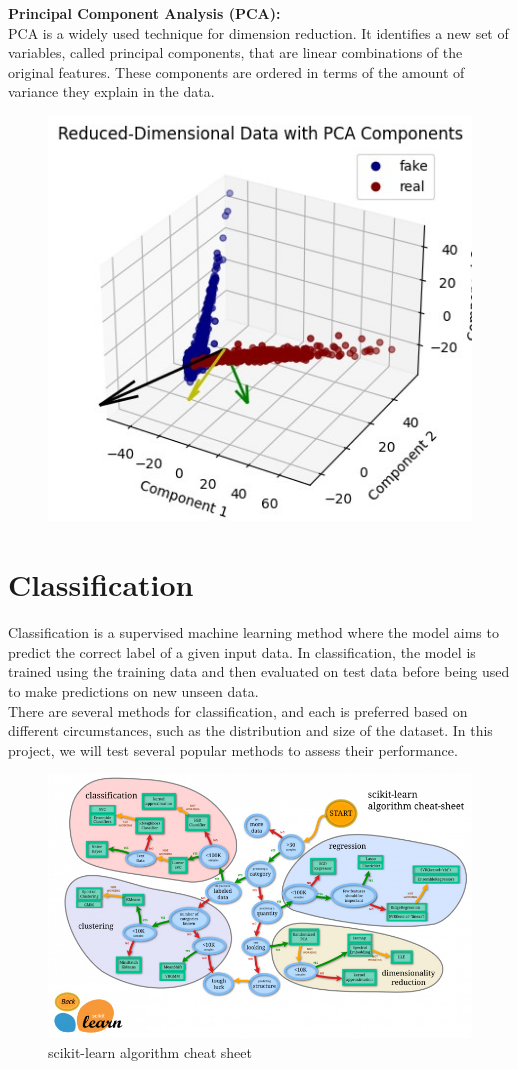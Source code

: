 \documentclass{template}
\begin{document}
\textbf{Principal Component Analysis (PCA):}\\
PCA is a widely used technique for dimension reduction. It identifies a new set of variables, called principal components, that are linear combinations of the original features. These components are ordered in terms of the amount of variance they explain in the data.
\begin{figure}
\includegraphics[scale=1]{pca.jpg}
\caption{}
\label{fig:logo}
\end{figure}
\chapter{Classification}\label{ch:me}

Classification is a supervised machine learning method where the model aims to predict the correct label of a given input data. In classification, the model is trained using the training data and then evaluated on test data before being used to make predictions on new unseen data.
\\
There are several methods for classification, and each is preferred based on different circumstances, such as the distribution and size of the dataset. In this project, we will test several popular methods to assess their performance.
\\
\begin{figure}
\includegraphics[scale=0.5]{ML_map.jpg}
\caption{scikit-learn algorithm cheat sheet}
\label{fig:logo}
\end{figure}
\end{document}
